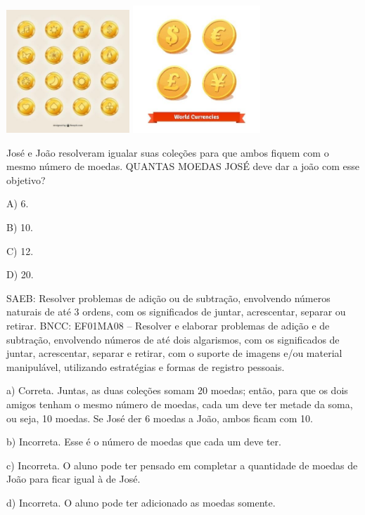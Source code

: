 \includegraphics[width=1.82292in,height=1.82292in]{media/image111.jpg}
\includegraphics[width=1.88542in,height=1.88542in]{media/image112.jpg}

José e João resolveram igualar suas coleções para que ambos fiquem com o mesmo número de moedas. QUANTAS MOEDAS JOSÉ deve dar a joão com esse objetivo?

A) 6.

B) 10.

C) 12.

D) 20.

SAEB: Resolver problemas de adição ou de subtração, envolvendo
números naturais de até 3 ordens, com os significados de juntar,
acrescentar, separar ou retirar.
BNCC: EF01MA08 -- Resolver e elaborar problemas de adição e de subtração,
envolvendo números de até dois algarismos, com os significados de
juntar, acrescentar, separar e retirar, com o suporte de imagens e/ou
material manipulável, utilizando estratégias e formas de registro
pessoais.

a) Correta. Juntas, as duas coleções somam 20 moedas; então, para que os dois amigos tenham o mesmo número de moedas, cada um deve ter metade da soma, ou seja, 10 moedas. Se José der 6 moedas a João, ambos ficam com 10.

b) Incorreta. Esse é o número de moedas que cada um deve ter.

c) Incorreta. O aluno pode ter pensado em completar a quantidade de
moedas de João para ficar igual à de José.

d) Incorreta. O aluno pode ter adicionado as moedas somente.


